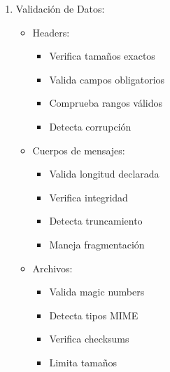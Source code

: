 \documentclass[12pt]{article}
\begin{document}
\begin{enumerate}
    \item Validación de Datos:
    \begin{itemize}
        \item Headers:
        \begin{itemize}
            \item Verifica tamaños exactos
            \item Valida campos obligatorios
            \item Comprueba rangos válidos
            \item Detecta corrupción
        \end{itemize}
        \item Cuerpos de mensajes:
        \begin{itemize}
            \item Valida longitud declarada
            \item Verifica integridad
            \item Detecta truncamiento
            \item Maneja fragmentación
        \end{itemize}
        \item Archivos:
        \begin{itemize}
            \item Valida magic numbers
            \item Detecta tipos MIME
            \item Verifica checksums
            \item Limita tamaños
        \end{itemize}
    \end{itemize}
\end{enumerate}
\end{document}
